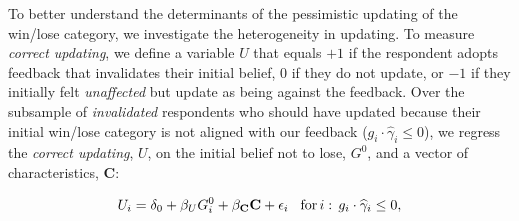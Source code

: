 \documentclass[12pt]{article} %
\begin{document}
\begin{appendices}
To better understand the determinants of the pessimistic updating of the win/lose category, we investigate the heterogeneity in updating. To measure \textit{correct updating}, we define a variable $U$ that equals $+1$ if the respondent adopts feedback that invalidates their initial belief, $0$ if they do not update, or $-1$ if they initially felt \emph{unaffected} but update as being against the feedback. Over the subsample of \textit{invalidated} respondents who should have updated because their initial win/lose category is not aligned with our feedback ($g_i\cdot\widehat{\gamma}_i \leq 0$), we regress the \textit{correct updating}, $U$, on the initial belief not to lose, $G^0$, and a vector of characteristics, \textbf{C}: %

\begin{equation}
	U_{i} = \delta_{0}+\beta_{U}G^0_{i}+\mathbf{\beta_C C}+\epsilon_{i}\hspace{0.3cm} \text{for}\,i:\,g_i\cdot\widehat{\gamma}_i \leq 0,
\end{equation} %



\end{appendices}
\end{document}
